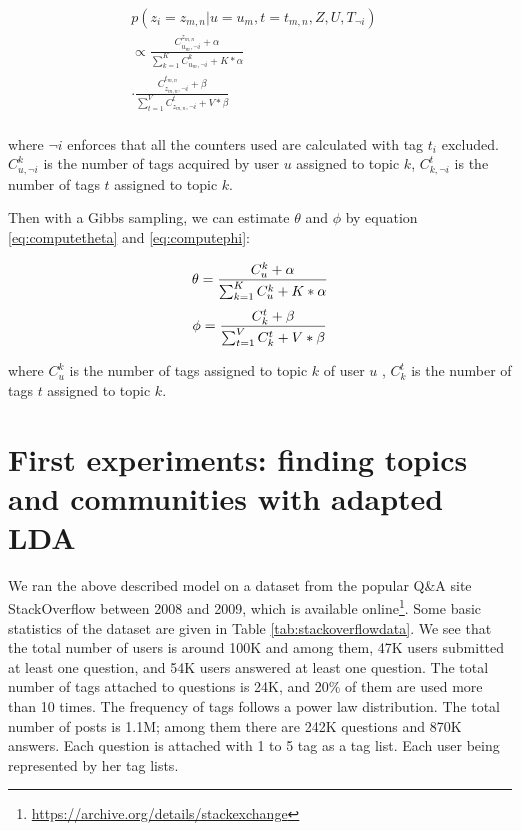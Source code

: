\begin{equation}
\begin{split}
p(z_i= z_{m,n} |u=u_m, t=t_{m,n}, Z, U, T_{\neg i}) &\\
\propto \frac{ C_{u_m,\neg i}^{z_{m,n}} + \alpha }{ \sum_{k=1}^K C_{u_m,\neg i}^k + K* \alpha} &\\
\cdot   \frac{ C_{z_{m,n},\neg i}^{t_{m,n}} + \beta }{ \sum_{t=1}^V C_{z_{m,n},\neg i}^t + V* \beta} &\\ 
\end{split}
\label{eq:ldasample}
\end{equation}

\noindent
where $\neg i$ enforces that all the counters used are calculated with tag $t_i$ excluded. $C_{u,\neg i}^k$ is the number of tags acquired by user $u$ assigned to topic $k$, $C_{k,\neg i}^{t}$ is the number of tags $t$ assigned to topic $k$.

Then with a Gibbs sampling, we can estimate $\theta$ and $\phi$ by equation \ref{eq:computetheta} and \ref{eq:computephi}:

\begin{equation}\scriptsize
\theta=\frac{ C_u^k + \alpha}{ \sum_{k=1}^K C_u^k+ K* \alpha}
\label{eq:computetheta} 
\end{equation}
\begin{equation}\scriptsize
\phi =\frac{ C_k^t + \beta}{ \sum_{t=1}^V C_k^t+ V* \beta}
\label{eq:computephi} 
\end{equation}

\noindent
where $C_u^k$ is the number of tags assigned to topic $k$ of user $u$ , $C_k^t$ is the number of tags $t$ assigned to topic $k$.


\section{First experiments: finding topics and communities with adapted LDA}

We ran the above described model on a dataset from the popular Q\&A site StackOverflow between 2008 and 2009, which is available online\footnote{\url{https://archive.org/details/stackexchange}}. Some basic statistics of the dataset are given in Table \ref{tab:stackoverflowdata}. We see that the total number of users is around 100K and among them, 47K users submitted at least one question, and 54K users answered at least one question. The total number of tags attached to questions is 24K, and 20\% of them are used more than 10 times. The frequency of tags follows a power law distribution. The total number of posts is 1.1M; among them there are 242K questions and 870K answers. Each question is attached with 1 to 5 tag as a tag list. Each user being represented by her tag lists. 

